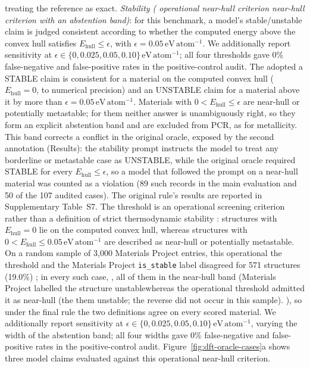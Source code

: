 \documentclass[pdflatex,sn-nature]{sn-jnl}
\newcommand{\rev}[1]{#1} %
\newcommand{\rev}[1]{{\color{blue}#1}} %
\providecommand{\DIFadd}[1]{{\protect\color{blue} \sf #1}} %
\providecommand{\DIFdel}[1]{{\protect\color{red} \scriptsize #1}} %
\providecommand{\DIFaddbegin}{} %
\providecommand{\DIFaddend}{} %
\providecommand{\DIFdelbegin}{} %
\providecommand{\DIFdelend}{} %
\providecommand{\DIFscaledelfig}{0.5}
\newlength{\DIFdelgraphicswidth} %
\newlength{\DIFdelgraphicsheight} %
\providecommand{\DIFaddincludegraphics}[2][]{{\color{blue}\fbox{\DIFOincludegraphics[#1]{#2}}}} %
\providecommand{\DIFdelincludegraphics}[2][]{%
\sbox{\DIFdelgraphicsbox}{\DIFOincludegraphics[#1]{#2}}%
\settoboxwidth{\DIFdelgraphicswidth}{\DIFdelgraphicsbox} %
\settoboxtotalheight{\DIFdelgraphicsheight}{\DIFdelgraphicsbox} %
\scalebox{\DIFscaledelfig}{%
\parbox[b]{\DIFdelgraphicswidth}{\usebox{\DIFdelgraphicsbox}\\[-\baselineskip] \rule{\DIFdelgraphicswidth}{0em}}\llap{\resizebox{\DIFdelgraphicswidth}{\DIFdelgraphicsheight}{%
\setlength{\unitlength}{\DIFdelgraphicswidth}%
\begin{picture}(1,1)%
\thicklines\linethickness{2pt} %
{\color[rgb]{1,0,0}\put(0,0){\framebox(1,1){}}}%
{\color[rgb]{1,0,0}\put(0,0){\line( 1,1){1}}}%
{\color[rgb]{1,0,0}\put(0,1){\line(1,-1){1}}}%
\end{picture}%
}\hspace*{3pt}}} %
} %
\DeclareRobustCommand{\DIFaddbegin}{\DIFOaddbegin \let\includegraphics\DIFaddincludegraphics} %
\DeclareRobustCommand{\DIFaddend}{\DIFOaddend \let\includegraphics\DIFOincludegraphics} %
\DeclareRobustCommand{\DIFdelbegin}{\DIFOdelbegin \let\includegraphics\DIFdelincludegraphics} %
\DeclareRobustCommand{\DIFdelend}{\DIFOaddend \let\includegraphics\DIFOincludegraphics} %
\begin{document}
treating the reference as exact. \emph{Stability (\DIFdelbegin \DIFdel{operational near-hull criterion}\DIFdelend \DIFaddbegin \DIFadd{\rev{near-hull criterion with an abstention band}}\DIFaddend )}: \DIFdelbegin \DIFdel{for this benchmark, a model's stable/unstable claim is judged consistent according to whether the computed energy above the convex hull satisfies
$E_{\mathrm{hull}}\leq\epsilon$, with $\epsilon=0.05\,\mathrm{eV\,atom^{-1}}$. We additionally report sensitivity at $\epsilon\in\{0,0.025,0.05,0.10\}\,\mathrm{eV\,atom^{-1}}$; all four thresholds gave 0\% false-negative and false-positive rates in the positive-control audit. The adopted }\DIFdelend \DIFaddbegin \DIFadd{\rev{a STABLE claim is consistent
for a material on the computed convex hull ($E_{\mathrm{hull}}=0$, to numerical precision) and an UNSTABLE
claim for a material above it by more than $\epsilon=0.05\,\mathrm{eV\,atom^{-1}}$. Materials with
$0<E_{\mathrm{hull}}\le\epsilon$ are near-hull or potentially metastable; for them neither answer is
unambiguously right, so they form an explicit abstention band and are excluded from PCR, as for
metallicity. This band corrects a conflict in the original oracle, exposed by the second annotation
(Results): the stability prompt instructs the model to treat any borderline or metastable case as
UNSTABLE, while the original oracle required STABLE for every $E_{\mathrm{hull}}\le\epsilon$, so a model
that followed the prompt on a near-hull material was counted as a violation (89 such records in the main
evaluation and 50 of the 107 audited cases). The original rule's results are reported in Supplementary
Table~S7.} The }\DIFaddend threshold is an operational screening criterion rather than a definition of strict
thermodynamic stability\DIFdelbegin \DIFdel{: structures with $E_{\mathrm{hull}}=0$ lie on the computed convex hull, whereas structures with $0<E_{\mathrm{hull}}\leq0.05\,\mathrm{eV\,atom^{-1}}$ are described as near-hull or potentially metastable}\DIFdelend . On a random sample of 3,000 Materials Project entries, \DIFdelbegin \DIFdel{this operational }\DIFdelend \DIFaddbegin \DIFadd{the }\DIFaddend threshold and the
Materials Project \texttt{is\_stable} label disagreed for 571 structures (19.0\%)\DIFdelbegin \DIFdel{; in every such case, }\DIFdelend \DIFaddbegin \DIFadd{, all of them in the
near-hull band (}\DIFaddend Materials Project labelled \DIFdelbegin \DIFdel{the structure unstablewhereas the operational threshold admitted it as near-hull (the }\DIFdelend \DIFaddbegin \DIFadd{them unstable; the }\DIFaddend reverse did not occur\DIFdelbegin \DIFdel{in this sample).
}\DIFdelend \DIFaddbegin \DIFadd{)\rev{, so under the
final rule the two definitions agree on every scored material}. We additionally report sensitivity at
$\epsilon\in\{0,0.025,0.05,0.10\}\,\mathrm{eV\,atom^{-1}}$, varying the width of the abstention band; all
four widths gave 0\% false-negative and false-positive rates in the positive-control audit.
}\DIFaddend Figure~\ref{fig:dft-oracle-cases}a shows three model claims evaluated against this operational near-hull criterion. 
\end{document}
